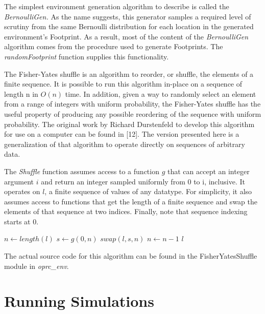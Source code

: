 The simplest environment generation algorithm to describe is called the \textit{BernoulliGen.} As the name suggests, this generator samples a required level of scrutiny from the same Bernoulli distribution for each location in the generated environment's Footprint. As a result, most of the content of the \textit{BernoulliGen} algorithm comes from the procedure used to generate Footprints. The \textit{randomFootprint} function supplies this functionality.  



The Fisher-Yates shuffle is an algorithm to reorder, or shuffle, the elements of a finite sequence. It is possible to run this algorithm in-place on a sequence of length n in $O(n)$ time. In addition, given a way to randomly select an element from a range of integers with uniform probability, the Fisher-Yates shuffle has the useful property of producing any possible reordering of the sequence with uniform probability. The original work by Richard Durstenfeld to develop this algorithm for use on a computer can be found in [12]. The version presented here is a generalization of that algorithm to operate directly on sequences of arbitrary data.

The \textit{Shuffle} function assumes access to a function $g$ that can accept an integer argument $i$ and return an integer sampled uniformly from 0 to i, inclusive. It operates on $l$, a finite sequence of values of any datatype. For simplicity, it also assumes access to functions that get the length of a finite sequence and swap the elements of that sequence at two indices. Finally, note that sequence indexing starts at 0.

\begin{algorithmic}

  \State $n\gets length(l)$	
      \State $s\gets g(0, n)$
      \State $swap(l, s, n)$
      \State $n\gets n - 1$
  \EndWhile
  \State \Return $l$
\EndFunction

\end{algorithmic}

The actual source code for this algorithm can be found in the FisherYatesShuffle module in \textit{oprc\_env}.

\section{Running Simulations}

